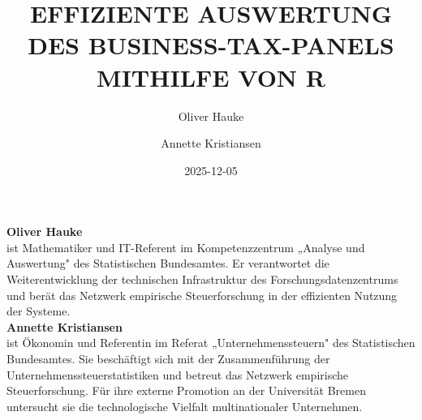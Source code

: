 \documentclass[
  german,
  10pt,
  twoside]{article}
\title{EFFIZIENTE AUSWERTUNG DES BUSINESS-TAX-PANELS MITHILFE VON R}
\author{Oliver Hauke \and Annette Kristiansen}
\date{2025-12-05}
\renewcommand{\maketitle}{}
\begin{document}
\maketitle

\begin{titlepage}
\thispagestyle{empty}
\pagestyle{empty}
\onecolumn

\noindent{\color{wistaBlue}\rule{\textwidth}{1pt}}

\vspace{-0.5cm}


\vspace*{0.5cm}

\begin{minipage}[t]{3.9cm}
%
\raggedleft
{}
\fontsize{7}{8.5}\selectfont
\vspace{0pt}%
{\fontsize{8}{9.5}\selectfont\color{wistaBlue}\textbf{Oliver Hauke}}\\[0.15cm]
ist Mathematiker und IT-Referent im Kompetenzzentrum „Analyse und Auswertung" des Statistischen Bundesamtes. Er verantwortet die Weiterentwicklung der technischen Infrastruktur des Forschungsdatenzentrums und berät das Netzwerk empirische Steuerforschung in der effizienten Nutzung der Systeme.\\[0.5cm]

{\fontsize{8}{9.5}\selectfont\color{wistaBlue}\textbf{Annette Kristiansen}}\\[0.15cm]
ist Ökonomin und Referentin im Referat „Unternehmenssteuern" des Statistischen Bundesamtes. Sie beschäftigt sich mit der Zusammenführung der Unternehmenssteuerstatistiken und betreut das Netzwerk empirische Steuerforschung. Für ihre externe Promotion an der Universität Bremen untersucht sie die technologische Vielfalt multinationaler Unternehmen.

\end{minipage}%
\hspace{0.4cm}%
\hspace{0.4cm}%
\begin{minipage}[t]{11.8cm}
\raggedright
\vspace{1.2cm}%


\end{minipage}
\end{titlepage}
\end{document}
